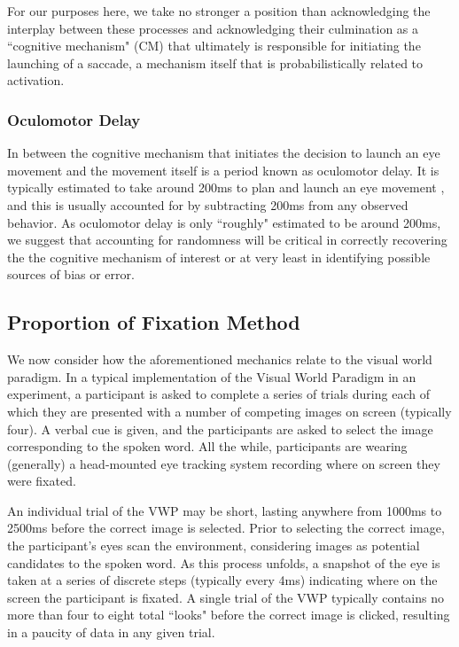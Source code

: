 \documentclass{article}
\begin{document}
For our purposes here, we take no stronger a position than acknowledging the interplay between these processes and acknowledging their culmination as a ``cognitive mechanism" (CM) that ultimately is responsible for initiating the launching of a saccade, a mechanism itself that is probabilistically related to activation.



\subsubsection{Oculomotor Delay}

In between the cognitive mechanism that initiates the decision to launch an eye movement and the movement itself is a period known as oculomotor delay. It is typically estimated to take around 200ms to plan and launch an eye movement \cite{viviani1990time}, and this is usually accounted for by subtracting 200ms from any observed behavior. As oculomotor delay is only ``roughly" estimated to be around 200ms, we suggest that accounting for randomness will be critical in correctly recovering the the cognitive mechanism of interest or at very least in identifying possible sources of bias or error. 





\subsection{Proportion of Fixation Method}


We now consider how the aforementioned mechanics relate to the visual world paradigm. In a typical implementation of the Visual World Paradigm in an experiment, a participant is asked to complete a series of trials during each of which they are presented with a number of competing images on screen (typically four). A verbal cue is given, and the participants are asked to select the image corresponding to the spoken word. All the while, participants are wearing (generally) a head-mounted eye tracking system recording where on screen they were fixated. 

An individual trial of the VWP may be short, lasting anywhere from 1000ms to 2500ms before the correct image is selected. Prior to selecting the correct image, the participant's eyes scan the environment, considering images as potential candidates to the spoken word. As this process unfolds, a snapshot of the eye is taken at a series of discrete steps (typically every 4ms) indicating where on the screen the participant is fixated. A single trial of the VWP typically contains no more than four to eight total ``looks" before the correct image is clicked, resulting in a paucity of data in any given trial.
\end{document}
